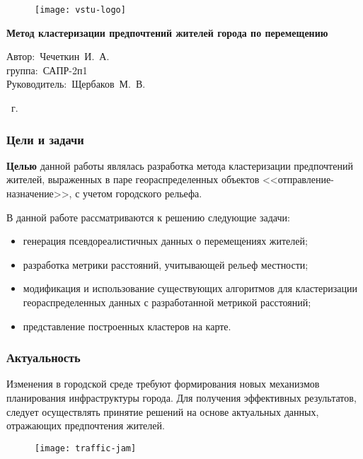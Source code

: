 \begin{frame}
    \begin{figure}
        \hspace*{-320pt}\texttt{[image: vstu-logo]}
    \end{figure}
    \vspace{2em}
    \begin{center}
        \large
        \textbf{Метод кластеризации предпочтений жителей города по перемещению}\\
    \end{center}
    \vspace{2em}
    \begin{flushleft}
        \hspace{12em}Автор:~Чечеткин~И.~А.\\
        \hspace{12em}группа:~САПР-2п1\\
        \hspace{12em}Руководитель:~Щербаков~М.~В.
    \end{flushleft}
    \vspace{3em}
     \the\year\ г.
\end{frame}

\begin{frame}
    \frametitle{Цели и задачи}
    \textbf{Целью} данной работы являлась разработка метода кластеризации предпочтений жителей, выраженных в паре геораспределенных объектов <<отправление-назначение>>, с учетом городского рельефа.

    В данной работе рассматриваются к решению следующие задачи:
    \begin{itemize}
        \item генерация псевдореалистичных данных о перемещениях жителей;
        \item разработка метрики расстояний, учитывающей рельеф местности;
        \item модификация и использование существующих алгоритмов для кластеризации геораспределенных данных с разработанной метрикой расстояний;
        \item представление построенных кластеров на карте.
    \end{itemize}
\end{frame}

\begin{frame}
    \frametitle{Актуальность}
    Изменения в городской среде требуют формирования новых механизмов планирования инфраструктуры города. 
    Для получения эффективных результатов, следует осуществлять принятие решений на основе актуальных 
    данных, отражающих предпочтения жителей.
    \begin{figure}
        \texttt{[image: traffic-jam]}
    \end{figure}
\end{frame}

